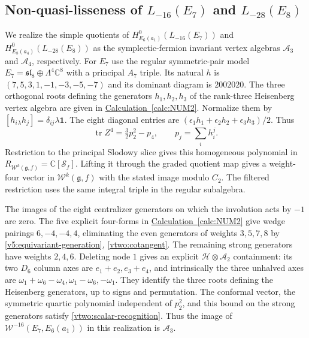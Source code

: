 \documentclass[11pt,a4paper]{amsart}
\numberwithin{equation}{section}
\theoremstyle{definition}
\theoremstyle{remark}
\newcommand{\C}{\mathbb C}
\newcommand{\g}{\mathfrak g}
\newcommand{\slg}{\mathfrak{sl}}
\newcommand{\tr}{\operatorname{tr}}
\begin{document}
\subsection{\texorpdfstring{Non-quasi-lisseness of $L_{-16}(E_7)$ and $L_{-28}(E_8)$}{Non-quasi-lisseness of L-16(E7) and L-28(E8)}}
We realize the simple quotients of
$H^0_{E_6(a_1)}(L_{-16}(E_7))$ and
$H^0_{E_8(a_4)}(L_{-28}(E_8))$ as the symplectic-fermion invariant
vertex algebras $\mathcal A_3$ and $\mathcal A_4$, respectively.
For $E_7$ use the regular symmetric-pair model
$E_7=\slg_8\oplus\Lambda^4\C^8$ with a principal $A_7$ triple.
Its natural $h$ is $(7,5,3,1,-1,-3,-5,-7)$ and its dominant diagram
is $2002020$. The three orthogonal roots defining the generators $h_1,h_2,h_3$
of the rank-three Heisenberg vertex algebra are given in
\hyperref[calc:NUM2]{Calculation~\ref*{calc:NUM2}}. Normalize them by $[h_i{}_{\lambda}h_j]=\delta_{ij}\lambda\mathbf1$.
The eight diagonal entries are
$(\epsilon_1h_1+\epsilon_2h_2+\epsilon_3h_3)/2$. Thus
$$
 \tr Z^4=\tfrac32p_2^2-p_4,
 \qquad p_j=\sum_i h_i^j.
$$
Restriction to the principal Slodowy slice gives this homogeneous
polynomial in $R_{\mathcal W^k(\g,f)}=\C[\mathcal S_f]$.
Lifting it through the graded quotient map gives a weight-four vector
in $\mathcal W^k(\g,f)$ with the stated image modulo $C_2$.
The filtered restriction uses the same integral triple in the regular
subalgebra.

The images of the eight centralizer generators on which the involution
acts by $-1$ are zero. The five explicit four-forms in \hyperref[calc:NUM2]{Calculation~\ref*{calc:NUM2}} give
wedge pairings $6,-4,-4,4$, eliminating the even generators of weights
$3,5,7,8$ by \cref{v5:equivariant-generation}, \cref{vtwo:cotangent}. The remaining strong generators have weights $2,4,6$. Deleting node $1$ gives an explicit
$\mathcal H\otimes \mathcal A_2$ containment: its two $D_6$ column axes are
$e_1+e_2,e_3+e_4$, and intrinsically the three unhalved axes are
$\omega_1+\omega_6-\omega_4,\omega_1-\omega_6,-\omega_1$.
They identify the three roots defining the Heisenberg generators,
up to signs and permutation.
The conformal vector, the symmetric quartic polynomial independent of
$p_2^2$, and this bound on the strong generators satisfy
\cref{vtwo:scalar-recognition}. Thus the image of
$\mathcal W^{-16}(E_7,E_6(a_1))$ in this realization is $\mathcal A_3$.
\end{document}
